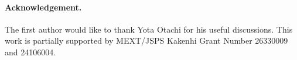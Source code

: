 \documentclass[a4paper]{llncs}
\begin{document}
\paragraph{Acknowledgement.}

The first author would like to thank Yota Otachi for his useful discussions. 
This work is partially supported by MEXT/JSPS Kakenhi Grant Number 26330009 and 24106004.









\end{document}
